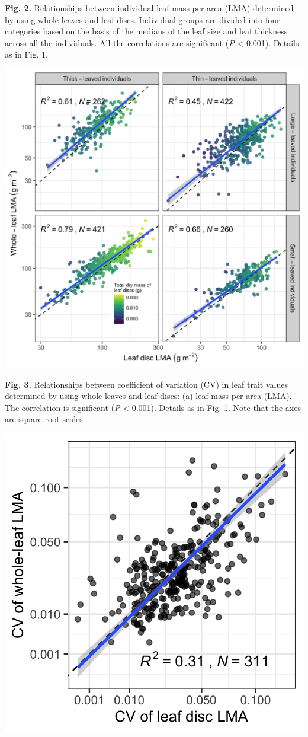 \documentclass[
  12pt,
  a4paper,
,tablecaptionabove
]{scrartcl}
\begin{document}
\textbf{Fig. 2.} Relationships between individual leaf mass per area
(LMA) determined by using whole leaves and leaf discs. Individual groups
are divided into four categories based on the basis of the medians of
the leaf size and leaf thickness across all the individuals. All the
correlations are significant (\emph{P} \textless{} 0.001). Details as in
Fig. 1.

\includegraphics{../figs/LMA_ind_gr.png}

\newpage

\textbf{Fig. 3.} Relationships between coefficient of variation (CV) in
leaf trait values determined by using whole leaves and leaf discs: (a)
leaf mass per area (LMA). The correlation is significant (\emph{P}
\textless{} 0.001). Details as in Fig. 1. Note that the axes are square
root scales.

\includegraphics{../figs/fig_cv.png}
\end{document}
